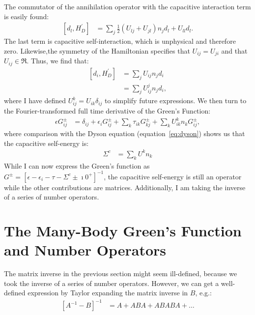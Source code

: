 The commutator of the annihilation operator with the capacitive interaction term is easily found:
\begin{align*}
\left[ d_l, H^\prime_D\right] &= \sum_{j} \frac{1}{2} \left( U_{lj} + U_{jl}\right) n_j d_l + U_{ll} d_l.
\end{align*}
The last term is capacitive self-interaction, which is unphysical and therefore zero. Likewise,the symmetry of the Hamiltonian specifies that $U_{ij} = U_{ji}$ and that $U_{ij} \in \Re$. Thus, we find that:
\begin{align*}
\left[ d_i, H^\prime_D\right] &=  \sum_{j}U_{ij} n_j d_i \\
&= \sum_j U^j_{ij} n_j d_i,
\end{align*}
where I have defined $U^k_{ij} = U_{ik} \delta_{ij}$ to simplify future expressions. We then turn to the Fourier-transformed full time derivative of the Green's Function:
\begin{align*}
\epsilon G_{ij}^\pm &= \delta_{ij} + \epsilon_i G_{ij}^\pm + \sum_k \tau_{ik} G_{kj}^\pm + \sum_k U^k_{ik} n_k G_{ij}^\pm,
\end{align*}
where comparison with the Dyson equation (equation~\ref{eq:dyson}) shows us that the capacitive self-energy is:
\begin{align}
\Sigma^{c} &= \sum_k U^k n_k
\label{eq:selfenergycapacitive}
\end{align}While I can now express the Green's function as $G^\pm = \left[ \epsilon - \epsilon_i - \tau - \Sigma^c \pm \imath 0^+\right]^{-1}$, the capacitive self-energy is still an operator while the other contributions are matrices. Additionally, I am taking the inverse of a series of number operators. 

\section{The Many-Body Green's Function and Number Operators}
\label{sec:mbgfno}
The matrix inverse in the previous section might seem ill-defined, because we took the inverse of a series of number operators. However, we can get a well-defined expression by Taylor expanding the matrix inverse in $B$, e.g.:
\begin{align}
\left[ A^{-1} - B\right]^{-1} &= A + ABA + ABABA + \ldots
\label{eq:inversionexpansion}
\end{align}


